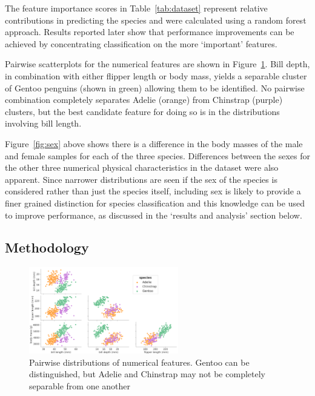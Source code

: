 \documentclass[12pt]{article}
\begin{document}
The feature importance scores in Table~\ref{tab:dataset} represent 
relative contributions in predicting the species and were calculated using a random forest approach.
Results reported later show that performance improvements can be achieved by
concentrating classification on the more `important' features.

Pairwise scatterplots for the numerical features are shown in Figure~\ref{fig:pairwise}. 
Bill depth, in combination with either flipper length or body mass, 
yields a separable cluster of Gentoo penguins (shown in green) allowing them to be identified. 
No pairwise combination completely separates Adelie (orange) from Chinstrap (purple) clusters, 
but the best candidate feature for doing so is in the distributions involving bill length.

Figure~\ref{fig:sex} above shows there is a difference in the body masses of the male and female samples for each of the three species. 
Differences between the sexes for the other three numerical physical characteristics in the dataset were also apparent. 
Since narrower distributions are seen if the sex of the species is considered rather than just the species itself, 
including sex is likely to provide a finer grained distinction for species classification 
and this knowledge can be used to improve performance, as discussed in the `results and analysis' section below. 

\subsection*{Methodology}

\begin{figure} %
  \centering
  \vspace{-3\baselineskip} %
  \includegraphics[width=0.58\textwidth]{pairwise.png} %
  \vspace{-0.5\baselineskip} %
  \caption{\centering\linespread{0.8}\selectfont Pairwise distributions of numerical features. Gentoo can be distinguished, 
  but Adelie and Chinstrap may not be completely separable from one another}
  \vspace{-0.5\baselineskip} %
  \label{fig:pairwise}
\end{figure}
\end{document}

